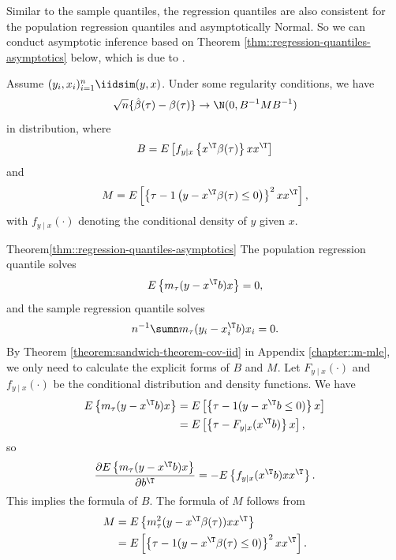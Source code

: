 Similar to the sample quantiles, the regression quantiles are also
consistent for the population regression quantiles and asymptotically
Normal. So we can conduct asymptotic inference based on  Theorem \ref{thm::regression-quantiles-asymptotics} below, which is due to \citet{angrist2006quantile}.


\begin{theorem}\label{thm::regression-quantiles-asymptotics}
Assume $(y_{i},x_{i})_{i=1}^{n}\iidsim(y,x)$. Under some regularity
conditions, we have
\[
\sqrt{n} \{ \hat{\beta}(\tau)-\beta(\tau) \} \rightarrow\N(0,B^{-1}MB^{-1})
\]
in distribution, where 
\[
B=E\left[f_{y\mid x}\left\{ x^{\T}\beta(\tau)\right\} xx^{\T}\right]
\]
and
\[
M=E\left[\left\{ \tau-1\left(y-x^{\T}\beta(\tau)\leq0\right)\right\} ^{2}xx^{\T}\right],
\]
with $f_{y\mid x}(\cdot)$ denoting the conditional density of $y$
given $x$.
\end{theorem}


\begin{myproof}{Theorem}{\ref{thm::regression-quantiles-asymptotics}}
The population regression quantile solves
\[
E\left\{ m_{\tau}(y-x^{\T}b)x\right\} =0,
\]
and the sample regression quantile solves
\[
n^{-1}\sumn m_{\tau}(y_{i}-x_{i}^{\T}b)x_{i}=0.
\]
By Theorem \ref{theorem:sandwich-theorem-cov-iid} in Appendix \ref{chapter::m-mle}, 
we only need to calculate the explicit forms of $B$
and $M$. Let $F_{y\mid x}(\cdot)$ and $f_{y\mid x}(\cdot)$ be the
conditional distribution and density functions. We have
\begin{align*}
E\left\{ m_{\tau}(y-x^{\T}b)x\right\}  & =E\left[\left\{ \tau-1(y-x^{\T}b\leq0)\right\} x\right]\\
 & =E\left[\left\{ \tau-F_{y\mid x}(x^{\T}b)\right\} x\right],
\end{align*}
so 
\[
\frac{\partial E\left\{ m_{\tau}(y-x^{\T}b)x\right\} }{\partial b^{\T}}
=-E\left\{ f_{y\mid x}(x^{\T}b)xx^{\T}\right\} .
\]
This implies the formula of $B$. The formula of $M$ follows from
\begin{align*}
M & =E\left\{ m_{\tau}^{2}(y-x^{\T}\beta(\tau))xx^{\T}\right\} \\
 & =E\left[\left\{ \tau-1(y-x^{\T}\beta(\tau)\leq0)\right\} ^{2}xx^{\T}\right].
\end{align*}
\end{myproof}




